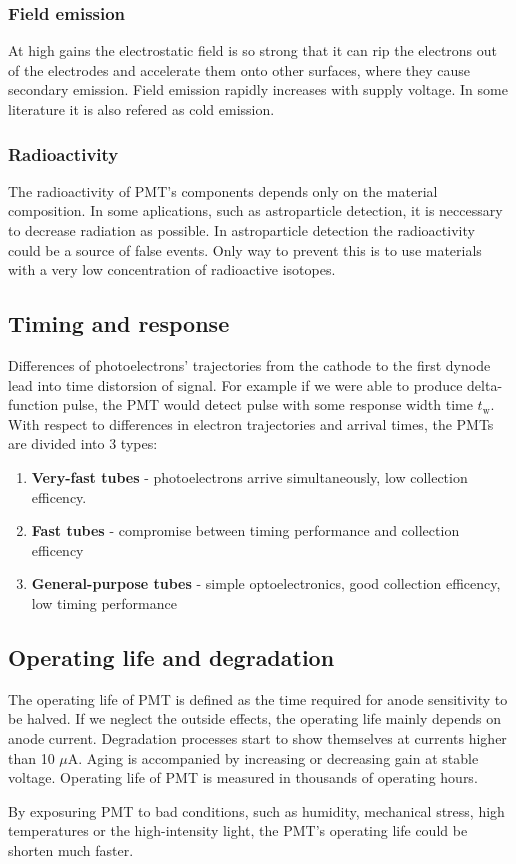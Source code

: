 \subsubsection{Field emission}
At high gains the electrostatic field is so strong that it can rip the electrons out of the electrodes and accelerate them onto other surfaces, where they cause secondary emission. Field emission rapidly increases with supply voltage. In some literature it is also refered as cold emission.
\subsubsection{Radioactivity}
The radioactivity of PMT's components depends only on the material composition. In some aplications, such as astroparticle detection, it is neccessary to decrease radiation as possible. In astroparticle detection the radioactivity could be a source of false events. Only way to prevent this is to use materials with a very low concentration of radioactive isotopes.

\subsection{Timing and response}
Differences of photoelectrons' trajectories from the cathode to the first dynode lead into time distorsion of signal. For example if we were able to produce delta-function pulse, the PMT would detect pulse with some response width time $t_\textrm{w}$.
With respect to differences in electron trajectories and arrival times, the PMTs are divided into 3 types:
\begin{enumerate}
\item \textbf{Very-fast tubes} - photoelectrons arrive simultaneously, low collection efficency.
\item \textbf{Fast tubes} - compromise between timing performance and collection efficency
\item \textbf{General-purpose tubes} - simple optoelectronics, good collection efficency, low timing performance
\end{enumerate}

\subsection{Operating life and degradation}
The operating life of PMT is defined as the time required for anode sensitivity to be halved. If we neglect the outside effects, the operating life mainly depends on anode current. 
Degradation processes start to show themselves at currents higher than 10 $\mu$A. Aging is accompanied by increasing or decreasing gain at stable voltage. Operating life of PMT is measured in thousands of operating hours.
\par
By exposuring PMT to bad conditions, such as humidity, mechanical stress, high temperatures or the high-intensity light, the PMT's operating life could be shorten much faster.
